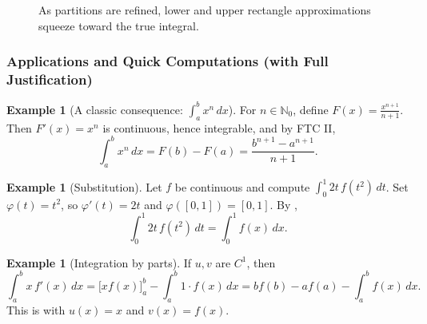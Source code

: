 \documentclass[12pt]{article}
\numberwithin{equation}{section}
\def\diff{d}
\newcommand{\NN}{\mathbb{N}}
\newcommand{\diff}{\mathop{}\!\mathrm{d}}    %
\theoremstyle{plain}
\theoremstyle{definition}
\newtheorem{example}[theorem]{Example}
\theoremstyle{remark}
\begin{document}
\begin{figure}[H]
\centering
{}
\caption{As partitions are refined, lower and upper rectangle approximations squeeze toward the true integral.}
\end{figure}

\subsubsection{Applications and Quick Computations (with Full Justification)}

\begin{example}[A classic consequence: $\int_a^b x^n\,\diff x$]
For $n\in\NN_0$, define $F(x)=\frac{x^{n+1}}{n+1}$.
Then $F'(x)=x^n$ is continuous, hence integrable, and by FTC II,
\[
\int_a^b x^n\,\diff x = F(b)-F(a)=\frac{b^{n+1}-a^{n+1}}{n+1}.
\]
\end{example}

\begin{example}[Substitution]
Let $f$ be continuous and compute $\int_0^1 2t\,f(t^2)\,\diff t$.
Set $\varphi(t)=t^2$, so $\varphi'(t)=2t$ and $\varphi([0,1])=[0,1]$.
By ,
\[
\int_0^1 2t\,f(t^2)\,\diff t
=\int_0^1 f(x)\,\diff x.
\]
\end{example}

\begin{example}[Integration by parts]
If $u,v$ are $C^1$, then
\[
\int_a^b x\,f'(x)\,\diff x
=
\bigl[x f(x)\bigr]_{a}^{b}-\int_a^b 1\cdot f(x)\,\diff x
=
b f(b)-a f(a)-\int_a^b f(x)\,\diff x.
\]
This is  with $u(x)=x$ and $v(x)=f(x)$.
\end{example}
\end{document}
